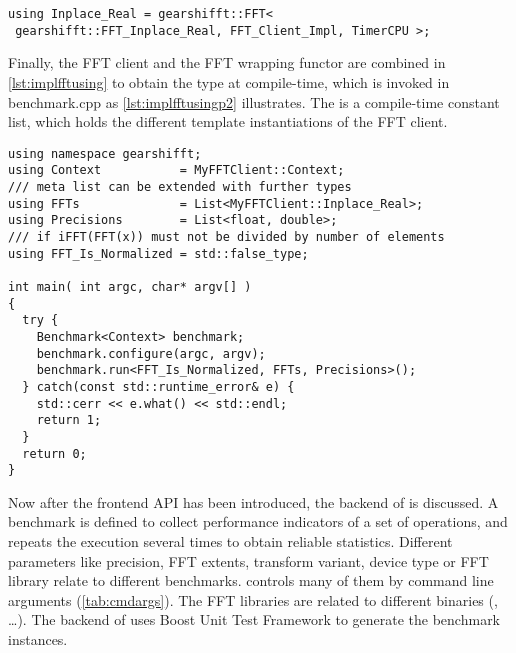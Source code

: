 \begin{lstlisting}[caption={Define FFT client types for corresponding FFTs},label={lst:implfftusing}]
using Inplace_Real = gearshifft::FFT<
 gearshifft::FFT_Inplace_Real, FFT_Client_Impl, TimerCPU >;
\end{lstlisting}

Finally, the FFT client and the FFT wrapping functor are combined in \cref{lst:implfftusing} to obtain the type at compile-time, which is invoked in benchmark.cpp as \cref{lst:implfftusingp2} illustrates. The  is a compile-time constant list, which holds the different template instantiations of the FFT client. 

\begin{lstlisting}[caption={Using FFT client types to run the benchmarks},label={lst:implfftusingp2}]
using namespace gearshifft;
using Context           = MyFFTClient::Context;         
/// meta list can be extended with further types
using FFTs              = List<MyFFTClient::Inplace_Real>;
using Precisions        = List<float, double>;   
/// if iFFT(FFT(x)) must not be divided by number of elements
using FFT_Is_Normalized = std::false_type;       

int main( int argc, char* argv[] )                       
{                                                        
  try {                                                  
    Benchmark<Context> benchmark;
    benchmark.configure(argc, argv);                     
    benchmark.run<FFT_Is_Normalized, FFTs, Precisions>();
  } catch(const std::runtime_error& e) {
    std::cerr << e.what() << std::endl;                  
    return 1;                                            
  }                                                      
  return 0;                                              
}                                                        
\end{lstlisting}


Now after the frontend API has been introduced, the backend of \gearshifft{} is discussed.
A benchmark is defined to collect performance indicators of a set of operations, and repeats the execution several times to obtain reliable statistics. Different parameters like precision, FFT extents, transform variant, device type or FFT library relate to different benchmarks.
\gearshifft{} controls many of them by command line arguments (\cref{tab:cmdargs}). The FFT libraries are related to different \gearshifft{} binaries (, \ldots).
The backend of \gearshifft{} uses Boost Unit Test Framework to generate the benchmark instances. %

